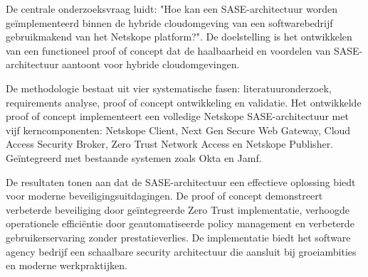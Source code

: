 \vspace{2ex}

De centrale onderzoeksvraag luidt: "Hoe kan een SASE-architectuur worden geïmplementeerd binnen de hybride cloudomgeving van een softwarebedrijf gebruikmakend van het Netskope platform?". De doelstelling is het ontwikkelen van een functioneel proof of concept dat de haalbaarheid en voordelen van SASE-architectuur aantoont voor hybride cloudomgevingen.

\vspace{2ex}

De methodologie bestaat uit vier systematische fasen: literatuuronderzoek, requirements analyse, proof of concept ontwikkeling en validatie. Het ontwikkelde proof of concept implementeert een volledige Netskope SASE-architectuur met vijf kerncomponenten: Netskope Client, Next Gen Secure Web Gateway, Cloud Access Security Broker, Zero Trust Network Access en Netskope Publisher. Geïntegreerd met bestaande systemen zoals Okta en Jamf.

\vspace{2ex}

De resultaten tonen aan dat de SASE-architectuur een effectieve oplossing biedt voor moderne beveiligingsuitdagingen. De proof of concept demonstreert verbeterde beveiliging door geïntegreerde Zero Trust implementatie, verhoogde operationele efficiëntie door geautomatiseerde policy management en verbeterde gebruikerservaring zonder prestatieverlies. De implementatie biedt het software agency bedrijf een schaalbare security architectuur die aansluit bij groeiambities en moderne werkpraktijken.
